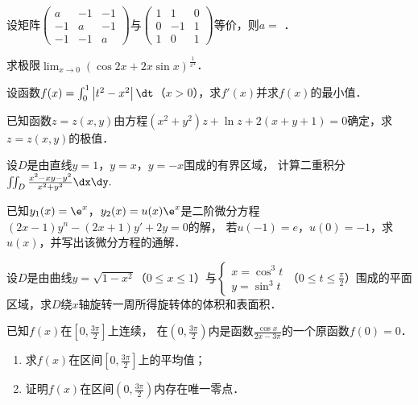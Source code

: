 \documentclass[plain,noanswer,medmath]{../../template/jnuexam}
\begin{document}
\begin{problem}
设矩阵$\begin{pmatrix}
   a & -1 & -1 \\
  -1 &  a & -1 \\
  -1 & -1 & a
\end{pmatrix}$与$\begin{pmatrix}
  1 &  1 & 0 \\
  0 & -1 & 1 \\
  1 &  0 & 1
\end{pmatrix}$等价，则$a =$ \fillin{}．
\end{problem}




\begin{problem}[points=10]
求极限$\lim_{x \to 0} (\cos 2x + 2x\sin x)^{\frac{1}{x^4}}$．
\end{problem}


\begin{problem}[points=10]
设函数$f(x) = \int_0^1 \left| t^2 - x^2 \right|\dt$（$x > 0$），求$f'(x)$并求$f(x)$的最小值．
\end{problem}


\begin{problem}[points=10]
已知函数$z = z(x,y)$由方程$(x^2 + y^2)z + \ln z + 2(x + y + 1) = 0$确定，求$z = z(x,y)$的极值．
\end{problem}


\begin{problem}[points=10]
设$D$是由直线$y = 1$，$y = x$，$y = - x$围成的有界区域，\goodbreak
计算二重积分$\iint_D \frac{x^2 - xy - y^2}{x^2 + y^2}\dx\dy.$
\end{problem}


\begin{problem}[points=10]
已知$y_1(x) = \e^x$，$y_2(x) = u(x) \e^x$是二阶微分方程$(2x - 1)y^n - (2x + 1)y' + 2y = 0$的解，
若$u(- 1) = e$，$u(0) = - 1$，求$u(x)$，并写出该微分方程的通解．
\end{problem}


\begin{problem}[points=11]
设$D$是由曲线$y = \sqrt{1 - x^2}$（$0 \le x \le 1$）与$\begin{cases}
  x = \cos^3 t \\
  y = \sin^3 t
\end{cases}$（$0 \le t \le \frac{\pi}{2}$）围成的平面区域，求$D$绕$x$轴旋转一周所得旋转体的体积和表面积．
\end{problem}


\begin{problem}[points=11]
已知$f(x)$在$\left[0,\frac{3\pi}{2} \right]$上连续，
在$\left(0,\frac{3\pi}{2} \right)$内是函数$\frac{\cos x}{2x - 3\pi}$的一个原函数$f(0) = 0$．
\begin{enumerate}
\item 求$f(x)$在区间$\left[0,\frac{3\pi}{2} \right]$上的平均值；
\item 证明$f(x)$在区间$\left(0,\frac{3\pi}{2} \right)$内存在唯一零点．
\end{enumerate}
\end{problem}
\end{document}
